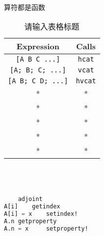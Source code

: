 
算符都是函数
\begin{table}[ht]
\centering
\caption{请输入表格标题}\label{JuFunc_tab1}
\begin{tabular}{|c|c|}
\hline
Expression & Calls \\
\hline
\verb|[A B C ...]| & \verb|hcat| \\
\hline
\verb|[A; B; C; ...]| & \verb|vcat| \\
\hline
\verb|[A B; C D; ...]| & \verb|hvcat| \\
\hline
* & * \\
\hline
* & * \\
\hline
* & * \\
\hline
* & * \\
\hline
* & * \\
\hline
\end{tabular}
\end{table}

\begin{lstlisting}[language=julia]
	
	
	
	
	adjoint
A[i]	getindex
A[i] = x	setindex!
A.n	getproperty
A.n = x 	setproperty!
\end{lstlisting}

